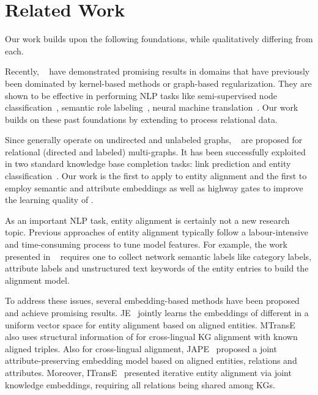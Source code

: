 
	
	\section{Related Work}
    Our work builds upon the following foundations, while qualitatively differing from each.


	 Recently, \GCNs~\cite{Duvenaud2015Convolutional,Kearnes2016Molecular}
    have demonstrated promising results in domains that have previously been dominated by kernel-based methods or graph-based regularization.
    They are shown to be effective in performing NLP tasks like semi-supervised
    node classification~\cite{Kipf2016Semi}, semantic role labeling~\cite{Marcheggiani2017Encoding}, neural machine
    translation~\cite{Bastings2017Graph}. Our work builds on these past foundations by extending \GCNs to process relational data.


	Since \GCNs generally operate on undirected and unlabeled graphs, \RGCNs~\cite{Schlichtkrull2017Modeling} are proposed  for relational
(directed and labeled) multi-graphs. It has been successfully exploited in two standard knowledge base completion tasks: link prediction
and entity classification~\cite{Schlichtkrull2017Modeling}. Our work is the first to apply \RGCNs to entity alignment and the first to
employ semantic and attribute embeddings as well as highway gates to improve the learning quality of \RGCNs.




	
	 As an important NLP task, entity alignment is certainly not a new research topic. Previous approaches of
entity alignment typically follow a labour-intensive and time-consuming process to tune model features. For example, the work presented in
~\cite{Wang2017} requires one to collect network semantic labels like category labels, attribute labels and unstructured
text keywords of the entity entries to build the alignment model.
	
	
	To address these issues, several embedding-based methods have been proposed and achieve promising results. JE~\cite{hao2016joint} jointly learns the embeddings of different \KGs in a uniform vector space for entity alignment based on aligned entities. MTransE~\cite{chen2016multilingual} also uses structural information of \KGs for cross-lingual KG alignment with known aligned triples. Also for cross-lingual \KG alignment, JAPE~\cite{sun2017cross} proposed a joint attribute-preserving embedding model based on aligned entities, relations and attributes. Moreover, ITransE~\cite{zhu2017iterative} presented iterative entity alignment via joint knowledge embeddings, requiring all relations being shared among KGs.
	
